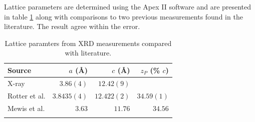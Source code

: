 Lattice parameters are determined using the Apex II software and are presented in table \ref{Table:ResD:LatticeParams} along with comparisons to two previous measurements found in the literature. The result agree within the error.
\medskip
\begin{table}[htbp]
    \begin{center}
        \caption{Lattice paramters from XRD measurements compared with literature.}
        \begin{tabular}{lrrr}
\toprule
Source  &  $a$ (\AA) & $c$ (\AA) & $z_P$ (\% $c$)\\
\midrule
X-ray   & $3.86(4)$  & $12.42(9)$ & \\
Rotter et al.\cite{Rotter2010} & $3.8435(4) $ & $12.422(2)$ & $34.59(1)$ \\
Mewis et al.\cite{Mewis1980} & $3.63$ & $11.76$ & $34.56$ \\
\bottomrule
        \label{Table:ResD:LatticeParams}
        \end{tabular}
    \end{center}
\end{table}

